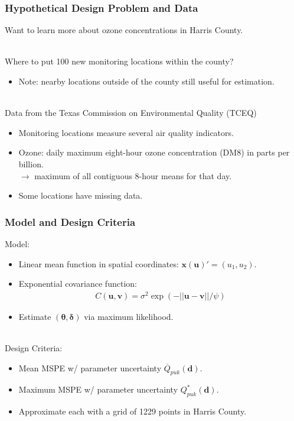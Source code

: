 \documentclass[xcolor=dvipsnames]{beamer}
\begin{document}
\begin{frame}
  \frametitle{Hypothetical Design Problem and Data}
  Want to learn more about ozone concentrations in Harris County. \\~

  Where to put 100 new monitoring locations within the county? \\
  \begin{itemize}
  \item[] Note: nearby locations outside of the county still useful for estimation.\\~\\
  \end{itemize}\pause

  Data from the Texas Commission on Environmental Quality (TCEQ)
  \begin{itemize}
  \item Monitoring locations measure several air quality indicators.
  \item Ozone: daily maximum eight-hour ozone concentration (DM8) in parts per billion.\\
    $\to$ maximum of all contiguous 8-hour means for that day.
  \item Some locations have missing data.
  \end{itemize}
\end{frame}

\begin{frame}
  \frametitle{Model and Design Criteria}
  Model:
  \begin{itemize}
  \item Linear mean function in spatial coordinates: $\bm{x}(\bm{u})' = (u_1, u_2)$.
  \item Exponential covariance function:
    \begin{align*}
      C(\bm{u},\bm{v}) = \sigma^2\exp(-||\bm{u} - \bm{v}||/\psi)
    \end{align*}
  \item Estimate $(\bm{\theta}, \bm{\delta})$ via maximum likelihood. \\~\\ \pause
  \end{itemize}

  Design Criteria:
  \begin{itemize}
  \item Mean MSPE w/ parameter uncertainty $\overline{Q}_{puk}(\bm{d})$.
  \item Maximum MSPE w/ parameter uncertainty $Q^*_{puk}(\bm{d})$.
  \item Approximate each with a grid of 1229 points in Harris County.
  \end{itemize}
\end{frame}
\end{document}
